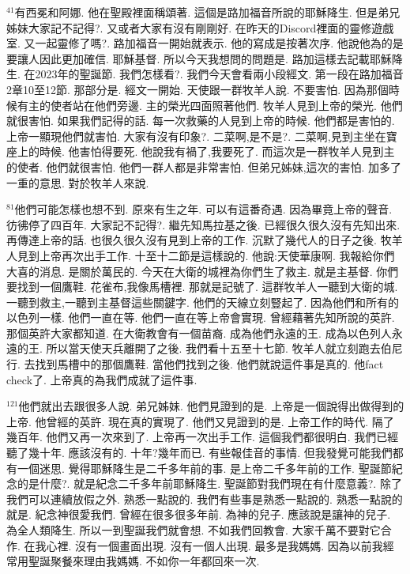 \documentclass{book}
\begin{document}
$^{41}$有西冕和阿娜.
他在聖殿裡面稱頌著.
這個是路加福音所說的耶穌降生.
但是弟兄姊妹大家記不記得?.
又或者大家有沒有剛剛好.
在昨天的Discord裡面的靈修遊戲室.
又一起靈修了嗎?.
路加福音一開始就表示.
他的寫成是按著次序.
他說他為的是要讓人因此更加確信.
耶穌基督.
所以今天我想問的問題是.
路加這樣去記載耶穌降生.
在2023年的聖誕節.
我們怎樣看?.
我們今天會看兩小段經文.
第一段在路加福音2章10至12節.
那部分是.
經文一開始.
天使跟一群牧羊人說.
不要害怕.
因為那個時候有主的使者站在他們旁邊.
主的榮光四面照著他們.
牧羊人見到上帝的榮光.
他們就很害怕.
如果我們記得的話.
每一次救藥的人見到上帝的時候.
他們都是害怕的.
上帝一顯現他們就害怕.
大家有沒有印象?.
二菜啊,是不是?.
二菜啊,見到主坐在寶座上的時候.
他害怕得要死.
他說我有禍了,我要死了.
而這次是一群牧羊人見到主的使者.
他們就很害怕.
他們一群人都是非常害怕.
但弟兄姊妹,這次的害怕.
加多了一重的意思.
對於牧羊人來說.

$^{81}$他們可能怎樣也想不到.
原來有生之年.
可以有這番奇遇.
因為畢竟上帝的聲音.
彷彿停了四百年.
大家記不記得?.
繼先知馬拉基之後.
已經很久很久沒有先知出來.
再傳達上帝的話.
也很久很久沒有見到上帝的工作.
沉默了幾代人的日子之後.
牧羊人見到上帝再次出手工作.
十至十二節是這樣說的.
他說:天使華康啊.
我報給你們大喜的消息.
是關於萬民的.
今天在大衛的城裡為你們生了救主.
就是主基督.
你們要找到一個鷹鞋.
花雀布,我像馬槽裡.
那就是記號了.
這群牧羊人一聽到大衛的城.
一聽到救主,一聽到主基督這些關鍵字.
他們的天線立刻豎起了.
因為他們和所有的以色列一樣.
他們一直在等.
他們一直在等上帝會實現.
曾經藉著先知所說的英許.
那個英許大家都知道.
在大衛教會有一個苗裔.
成為他們永遠的王.
成為以色列人永遠的王.
所以當天使天兵離開了之後.
我們看十五至十七節.
牧羊人就立刻跑去伯尼行.
去找到馬槽中的那個鷹鞋.
當他們找到之後.
他們就說這件事是真的.
他fact check了.
上帝真的為我們成就了這件事.

$^{121}$他們就出去跟很多人說.
弟兄姊妹.
他們見證到的是.
上帝是一個說得出做得到的上帝.
他曾經的英許.
現在真的實現了.
他們又見證到的是.
上帝工作的時代.
隔了幾百年.
他們又再一次來到了.
上帝再一次出手工作.
這個我們都很明白.
我們已經聽了幾十年.
應該沒有的.
十年?幾年而已.
有些報佳音的事情.
但我發覺可能我們都有一個迷思.
覺得耶穌降生是二千多年前的事.
是上帝二千多年前的工作.
聖誕節紀念的是什麼?.
就是紀念二千多年前耶穌降生.
聖誕節對我們現在有什麼意義?.
除了我們可以連續放假之外.
熟悉一點說的.
我們有些事是熟悉一點說的.
熟悉一點說的就是.
紀念神很愛我們.
曾經在很多很多年前.
為神的兒子.
應該說是讓神的兒子.
為全人類降生.
所以一到聖誕我們就會想.
不如我們回教會.
大家千萬不要對它合作.
在我心裡.
沒有一個畫面出現.
沒有一個人出現.
最多是我媽媽.
因為以前我經常用聖誕聚餐來理由我媽媽.
不如你一年都回來一次.
\end{document}

